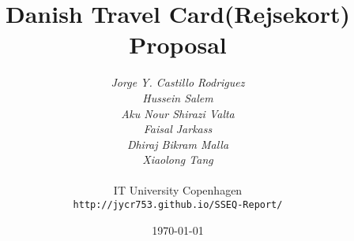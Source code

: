 \documentclass[10pt,a4paper,oneside]{scrreprt}
\begin{document}
\title{Danish Travel Card(Rejsekort) Proposal}
\author{\textit{Jorge Y. Castillo Rodriguez}\\
  \textit{Hussein Salem}\\
  \textit{Aku Nour Shirazi Valta}\\
  \textit{Faisal Jarkass}\\
  \textit{Dhiraj Bikram Malla}\\
  \textit{Xiaolong Tang}\\
  \\
  IT University Copenhagen\\
  \texttt{http://jycr753.github.io/SSEQ-Report/}}
\date{\today}
\maketitle



\end{document}
